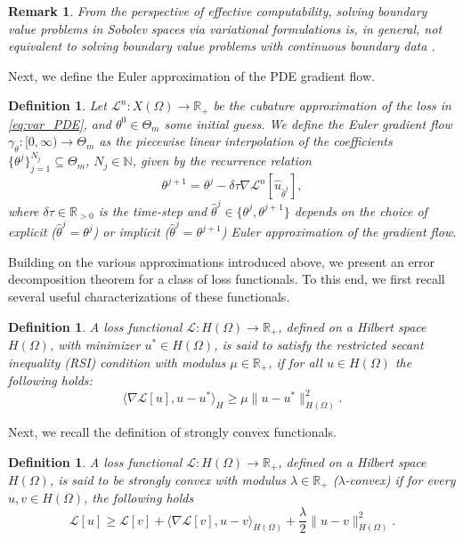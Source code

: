 \documentclass[pdflatex]{sn-jnl}%
\newtheorem{remark}[theorem]{Remark}
\newtheorem{definition}[theorem]{Definition}
\begin{document}
\begin{remark}
From the perspective of effective computability, solving boundary value problems in Sobolev spaces via variational formulations is, in general, not equivalent to solving boundary value problems with continuous boundary data \cite{Boche2026ComputableEnergy,Boche2026-kq}.
\end{remark}
Next, we define the Euler approximation of the PDE gradient flow.   
\begin{definition}
    Let $\mathcal{L}^n:X(\Omega)\rightarrow \mathbb{R}_+$ be the cubature approximation of the loss in \eqref{eq:var_PDE}, and $\theta^0\in \Theta_m$ some initial guess. We define the \emph{Euler gradient flow} $\gamma_\theta:[0,\infty)\rightarrow\Theta_m$ as the piecewise linear interpolation of the coefficients $\{\theta^j\}_{j=1}^{N_j}\subseteq\Theta_m$, $N_j\in \mathbb{N}$, given by the recurrence relation
    \begin{equation}
        \theta^{j+1} = \theta^j - \delta\tau\nabla\mathcal{L}^n[\hat{u}_{\hat{\theta}^{j}}],
    \end{equation}
    where $\delta \tau\in \mathbb{R}_{>0}$ is the time-step and $\hat{\theta}^{j}\in\{\theta^j,\theta^{j+1}\}$ depends on the choice of explicit ($\hat{\theta}^{j} =\theta^j$) or implicit ($\hat{\theta}^{j} =\theta^{j+1}$) Euler approximation of the gradient flow.
\end{definition}
Building on the various approximations introduced above, we present an error decomposition theorem for a class of loss functionals. To this end, we first recall several useful characterizations of these functionals.
\begin{definition}\label{def:RSI_cond}
    A loss functional $\mathcal{L}:H(\Omega)\rightarrow \mathbb{R}_+$, defined on a Hilbert space $H(\Omega)$, with minimizer $u^*\in H(\Omega)$, is said to satisfy the \emph{restricted secant inequality (RSI)} condition with modulus $\mu\in \mathbb{R}_+$, if for all $u\in H(\Omega)$ the following holds:
    \begin{equation}
        \langle \nabla\mathcal{L}[u],u-u^*\rangle_H\geq\mu\|u-u^*\|_{H(\Omega)}^2. 
    \end{equation}
\end{definition}
Next, we recall the definition of strongly convex functionals.
\begin{definition}\label{def:lam_conv}
    A loss functional $\mathcal{L}:H(\Omega)\rightarrow \mathbb{R}_+$, defined on a Hilbert space $H(\Omega)$, is said to be \emph{strongly convex} with modulus $\lambda\in \mathbb{R}_+$ (\emph{$\lambda$-convex}) if for every $u,v\in H(\Omega)$, the following holds 
    \begin{equation}
        \mathcal{L}[u]\geq\mathcal{L}[v] +\langle\nabla\mathcal{L}[v],u-v \rangle_{H(\Omega)} +\frac{\lambda}{2}\|u-v\|_{H(\Omega)}^2.
    \end{equation}
\end{definition}
\end{document}
